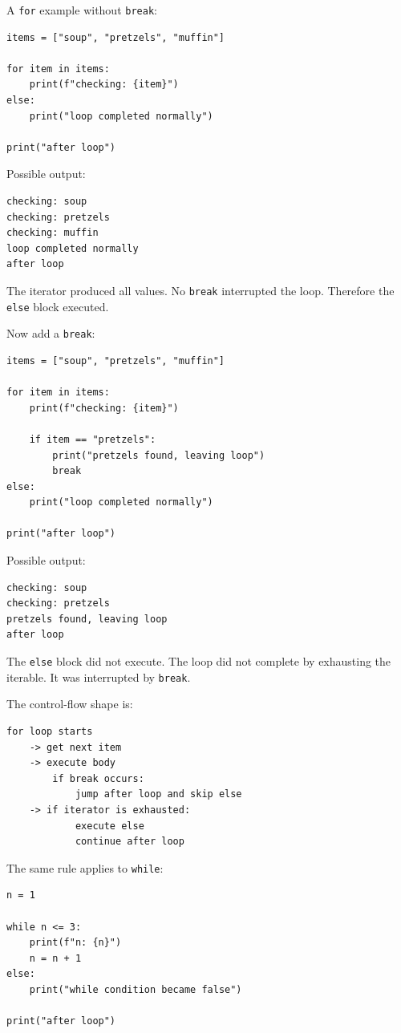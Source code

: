 A \texttt{for} example without \texttt{break}:

\begin{verbatim}
items = ["soup", "pretzels", "muffin"]

for item in items:
    print(f"checking: {item}")
else:
    print("loop completed normally")

print("after loop")
\end{verbatim}

Possible output:

\begin{verbatim}
checking: soup
checking: pretzels
checking: muffin
loop completed normally
after loop
\end{verbatim}

The iterator produced all values. No \texttt{break} interrupted the loop. Therefore the \texttt{else} block executed.

Now add a \texttt{break}:

\begin{verbatim}
items = ["soup", "pretzels", "muffin"]

for item in items:
    print(f"checking: {item}")

    if item == "pretzels":
        print("pretzels found, leaving loop")
        break
else:
    print("loop completed normally")

print("after loop")
\end{verbatim}

Possible output:

\begin{verbatim}
checking: soup
checking: pretzels
pretzels found, leaving loop
after loop
\end{verbatim}

The \texttt{else} block did not execute. The loop did not complete by exhausting the iterable. It was interrupted by \texttt{break}.

The control-flow shape is:

\begin{verbatim}
for loop starts
    -> get next item
    -> execute body
        if break occurs:
            jump after loop and skip else
    -> if iterator is exhausted:
            execute else
            continue after loop
\end{verbatim}

The same rule applies to \texttt{while}:

\begin{verbatim}
n = 1

while n <= 3:
    print(f"n: {n}")
    n = n + 1
else:
    print("while condition became false")

print("after loop")
\end{verbatim}


